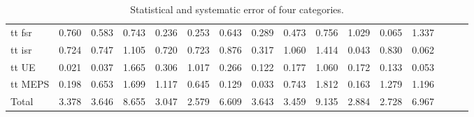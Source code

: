 \begin{sidewaystable}[p]
\begin{tabular}{|l|ccc|ccc|ccc|ccc|ccc|}
  tt fsr                                     & 0.760 & 0.583 & 0.743 & 0.236 & 0.253 & 0.643 & 0.289 & 0.473 & 0.756 & 1.029 & 0.065 & 1.337 \\ 
  tt isr                                     & 0.724 & 0.747 & 1.105 & 0.720 & 0.723 & 0.876 & 0.317 & 1.060 & 1.414 & 0.043 & 0.830 & 0.062 \\ 
  tt UE                                      & 0.021 & 0.037 & 1.665 & 0.306 & 1.017 & 0.266 & 0.122 & 0.177 & 1.060 & 0.172 & 0.133 & 0.053 \\ 
  tt MEPS                                    & 0.198 & 0.653 & 1.699 & 1.117 & 0.645 & 0.129 & 0.033 & 0.743 & 1.812 & 0.163 & 1.279 & 1.196 \\ 
  \hline
  Total                                      & 3.378 & 3.646 & 8.655 & 3.047 & 2.579 & 6.609 & 3.643 & 3.459 & 9.135 & 2.884 & 2.728 & 6.967 \\ 
  \hline
  \end{tabular}
  \caption{ Statistical and systematic error of four categories. }
  \label{tab:syst_alt}
\end{sidewaystable}
